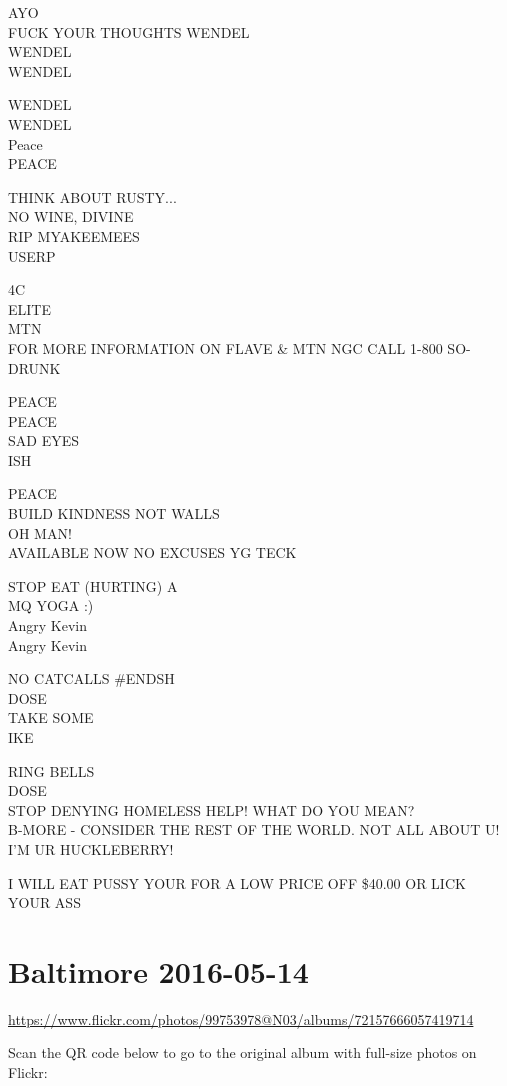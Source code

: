 \documentclass[10pt,letterpaper]{article}
\begin{document}
AYO\\
FUCK YOUR THOUGHTS WENDEL\\
WENDEL\\
WENDEL

WENDEL\\
WENDEL\\
Peace\\
PEACE

THINK ABOUT RUSTY...\\
NO WINE, DIVINE\\
RIP MYAKEEMEES\\
USERP

4C\\
ELITE\\
MTN\\
FOR MORE INFORMATION ON FLAVE \& MTN NGC CALL 1{-}800 SO{-}DRUNK

PEACE\\
PEACE\\
SAD EYES\\
ISH

PEACE\\
BUILD KINDNESS NOT WALLS\\
OH MAN!\\
AVAILABLE NOW NO EXCUSES YG TECK

STOP EAT (HURTING) A\\
MQ YOGA :)\\
Angry Kevin\\
Angry Kevin

NO CATCALLS \#ENDSH\\
DOSE\\
TAKE SOME\\
IKE

RING BELLS\\
DOSE\\
STOP DENYING HOMELESS HELP!  WHAT DO YOU MEAN?\\
B{-}MORE {-} CONSIDER THE REST OF THE WORLD.  NOT ALL ABOUT U!  I'M UR HUCKLEBERRY!

I WILL EAT PUSSY YOUR FOR A LOW PRICE OFF \$40.00 OR LICK YOUR ASS


\section*{Baltimore 2016-05-14}

\url{https://www.flickr.com/photos/99753978@N03/albums/72157666057419714}

Scan the QR code below to go to the original album with full-size photos on Flickr:
\end{document}
